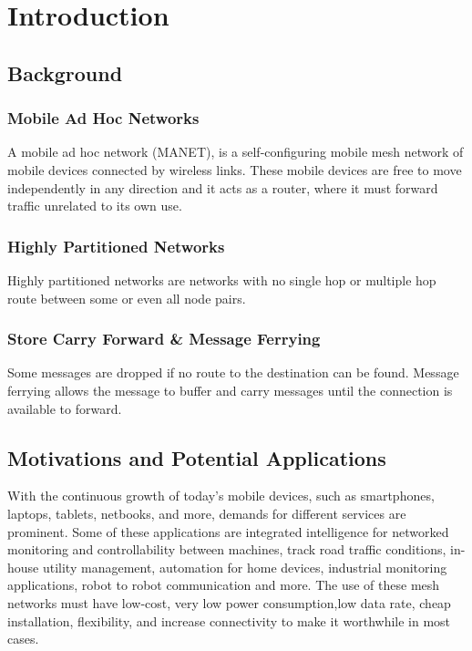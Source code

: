 \chapter{Introduction} 

\section{Background}

\subsection{Mobile Ad Hoc Networks}
A mobile ad hoc network (MANET),  is a self-configuring mobile mesh network of mobile devices connected by wireless links.  
These mobile devices are free to move independently in any direction and it acts as a router, where it must forward traffic unrelated to its own use. 

\subsection{Highly Partitioned Networks}
Highly partitioned networks are networks with no single hop or multiple hop route between some or even all node pairs.

\subsection{Store Carry Forward \& Message Ferrying}
Some messages are dropped if no route to the destination can be found.  
Message ferrying allows the message to buffer and carry messages until the connection is available to forward.

\section{Motivations and Potential Applications}

With the continuous growth of today's mobile devices, such as smartphones, laptops, tablets, netbooks, and more, demands for different services are prominent. 
Some of these applications are integrated intelligence for networked monitoring and controllability between machines, track road traffic conditions, in-house utility management, automation for home devices, industrial monitoring applications, robot to robot communication and more.  
The use of these mesh networks must have low-cost, very low power consumption,low data rate, cheap installation, flexibility, and increase connectivity to make it worthwhile in most cases.


